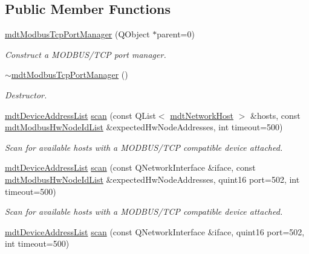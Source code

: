 \subsection*{Public Member Functions}
\begin{DoxyCompactItemize}
\item 
\hyperlink{classmdt_modbus_tcp_port_manager_a2f65f779bbad19d9d3f85ef35220ffb8}{mdt\-Modbus\-Tcp\-Port\-Manager} (Q\-Object $\ast$parent=0)
\begin{DoxyCompactList}\small\item\em Construct a M\-O\-D\-B\-U\-S/\-T\-C\-P port manager. \end{DoxyCompactList}\item 
\hyperlink{classmdt_modbus_tcp_port_manager_aabe51a50a53c6b23884cc4862730b731}{$\sim$mdt\-Modbus\-Tcp\-Port\-Manager} ()
\begin{DoxyCompactList}\small\item\em Destructor. \end{DoxyCompactList}\item 
\hyperlink{classmdt_device_address_list}{mdt\-Device\-Address\-List} \hyperlink{classmdt_modbus_tcp_port_manager_ab41c834385ca861ae7a43a12ba60687d}{scan} (const Q\-List$<$ \hyperlink{structmdt_network_host}{mdt\-Network\-Host} $>$ \&hosts, const \hyperlink{classmdt_modbus_hw_node_id_list}{mdt\-Modbus\-Hw\-Node\-Id\-List} \&expected\-Hw\-Node\-Addresses, int timeout=500)
\begin{DoxyCompactList}\small\item\em Scan for available hosts with a M\-O\-D\-B\-U\-S/\-T\-C\-P compatible device attached. \end{DoxyCompactList}\item 
\hyperlink{classmdt_device_address_list}{mdt\-Device\-Address\-List} \hyperlink{classmdt_modbus_tcp_port_manager_a25ccd1cb800e8396cb6e45e3a502dbf9}{scan} (const Q\-Network\-Interface \&iface, const \hyperlink{classmdt_modbus_hw_node_id_list}{mdt\-Modbus\-Hw\-Node\-Id\-List} \&expected\-Hw\-Node\-Addresses, quint16 port=502, int timeout=500)
\begin{DoxyCompactList}\small\item\em Scan for available hosts with a M\-O\-D\-B\-U\-S/\-T\-C\-P compatible device attached. \end{DoxyCompactList}\item 
\hyperlink{classmdt_device_address_list}{mdt\-Device\-Address\-List} \hyperlink{classmdt_modbus_tcp_port_manager_a49e01b4a0528d591e77206d649199ae2}{scan} (const Q\-Network\-Interface \&iface, quint16 port=502, int timeout=500)

\end{DoxyCompactItemize}
